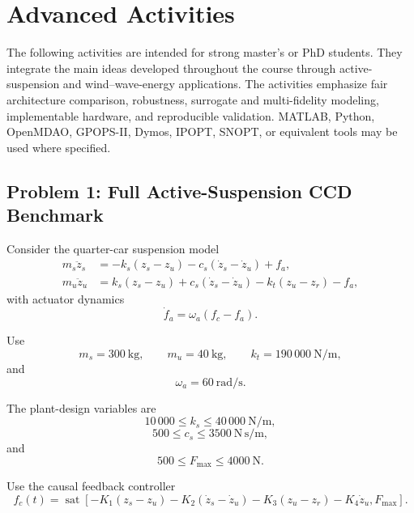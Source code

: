 
\section{Advanced Activities}

The following activities are intended for strong master's or PhD students.
They integrate the main ideas developed throughout the course through
active-suspension and wind--wave-energy applications. The activities emphasize
fair architecture comparison, robustness, surrogate and multi-fidelity
modeling, implementable hardware, and reproducible validation. MATLAB, Python,
OpenMDAO, GPOPS-II, Dymos, IPOPT, SNOPT, or equivalent tools may be used where
specified.

\subsection*{Problem 1: Full Active-Suspension CCD Benchmark}

Consider the quarter-car suspension model
\begin{align}
m_s\ddot{z}_s
&=
-k_s(z_s-z_u)
-c_s(\dot{z}_s-\dot{z}_u)
+f_a,
\\
m_u\ddot{z}_u
&=
k_s(z_s-z_u)
+c_s(\dot{z}_s-\dot{z}_u)
-k_t(z_u-z_r)
-f_a,
\end{align}
with actuator dynamics
\begin{equation}
\dot{f}_a
=
\omega_a
\left(
f_c-f_a
\right).
\end{equation}

Use
\begin{equation}
m_s=300~\mathrm{kg},
\qquad
m_u=40~\mathrm{kg},
\qquad
k_t=190\,000~\mathrm{N/m},
\end{equation}
and
\begin{equation}
\omega_a=60~\mathrm{rad/s}.
\end{equation}

The plant-design variables are
\begin{equation}
10\,000\leq k_s\leq40\,000~\mathrm{N/m},
\end{equation}
\begin{equation}
500\leq c_s\leq3500~\mathrm{N\,s/m},
\end{equation}
and
\begin{equation}
500\leq F_{\max}\leq4000~\mathrm{N}.
\end{equation}

Use the causal feedback controller
\begin{equation}
f_c(t)
=
\operatorname{sat}
\left[
-K_1(z_s-z_u)
-K_2(\dot{z}_s-\dot{z}_u)
-K_3(z_u-z_r)
-K_4\dot{z}_u,
F_{\max}
\right].
\end{equation}

